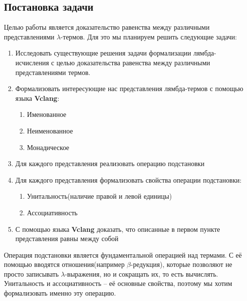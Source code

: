 \subsection{Постановка задачи}
Целью работы является доказательство равенства между различными представлениями $\lambda$-термов. Для это мы планируем решить следующие задачи:

\begin{enumerate}
  \item Исследовать существующие решения задачи формализации лямбда-исчисления с целью доказательства равенства между различными представлениями термов.
  \item Формализовать интересующие нас представления лямбда-термов с помощью языка \textbf{Vclang}:
    \begin{enumerate}
      \item Именованное
      \item Неименованное
      \item Монадическое
    \end{enumerate}
  \item Для каждого представления реализовать операцию подстановки
  \item Для каждого представления формализовать свойства операции подстановки:
    \begin{enumerate}
      \item Унитальность(наличие правой и левой единицы)
      \item Ассоциативность
    \end{enumerate}
  \item С помощью языка \textbf{Vclang} доказать, что описанные в первом пункте представления равны между собой
\end{enumerate}

Операция подстановки является фундаментальной операцией над термами. С её помощью вводятся отношения(например $\beta$-редукция), которые позволяют не просто записывать $\lambda$-выражения, но и сокращать их, то есть вычислять. Унитальность и ассоциативность -- её основные свойства, поэтому мы хотим формализовать именно эту операцию.

